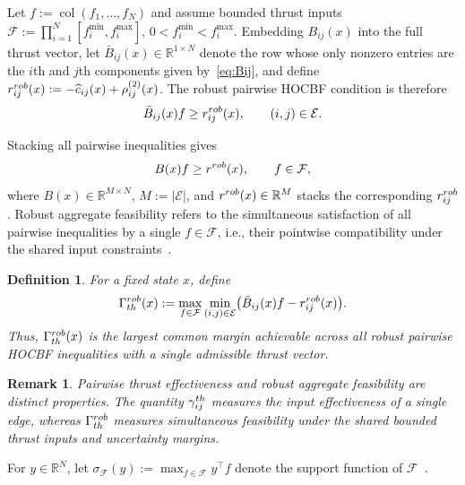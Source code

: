 \documentclass[10pt,a4paper]{amsart}
\newtheorem{definition}[theorem]{Definition}
\newtheorem{remark}[theorem]{Remark}
\begin{document}
Let $f:=\operatorname{col}(f_1,\ldots,f_N)$ and assume bounded
thrust inputs
$\displaystyle{\mathcal F:=\prod_{i=1}^N[f_i^{\min},f_i^{\max}]},\,
 0<f_i^{\min}<f_i^{\max}$.
Embedding $B_{ij}(x)$ into the full thrust vector, let
$\bar B_{ij}(x)\in\mathbb R^{1\times N}$ denote the row whose
only nonzero entries are the $i$th and $j$th components
given by~\eqref{eq:Bij}, and define
$r_{ij}^{\rm rob}(x):=
-\widehat c_{ij}(x)+\rho_{ij}^{(2)}(x)$. The robust pairwise HOCBF condition is therefore
\begin{equation}
    \bar B_{ij}(x)f\ge r_{ij}^{\rm rob}(x),
    \qquad (i,j)\in\mathcal E.
    \label{eq:pairwise_affine_constraint}
\end{equation}

Stacking all pairwise inequalities gives
\begin{equation}
    B(x)f\ge r^{\rm rob}(x),
    \qquad f\in\mathcal F,
    \label{eq:aggregate_constraints}
\end{equation}
where $B(x)\in\mathbb R^{M\times N}$,
$M:=|\mathcal E|$, and $r^{\rm rob}(x)\in\mathbb R^M$
stacks the corresponding $r_{ij}^{\rm rob}$. Robust aggregate
feasibility refers to the simultaneous satisfaction of all
pairwise inequalities by a single $f\in\mathcal F$, i.e.,
their pointwise compatibility under the shared input
constraints~\cite{tan2022compatibility}.

\begin{definition}
For a fixed state $x$, define
\begin{equation}
    \Gamma_{\rm th}^{\rm rob}(x)
    :=
    \max_{f\in\mathcal F}
    \min_{(i,j)\in\mathcal E}
    \bigl(
        \bar B_{ij}(x)f-r_{ij}^{\rm rob}(x)
    \bigr).
    \label{eq:Gamma_th_primal}
\end{equation}
Thus, $\Gamma_{\rm th}^{\rm rob}(x)$ is the largest common
margin achievable across all robust pairwise HOCBF
inequalities with a single admissible thrust vector.
\end{definition}

\begin{remark}
Pairwise thrust effectiveness and robust aggregate feasibility
are distinct properties. The quantity $\gamma_{ij}^{\rm th}$
measures the input effectiveness of a single edge, whereas
$\Gamma_{\rm th}^{\rm rob}$ measures simultaneous feasibility
under the shared bounded thrust inputs and uncertainty margins.
\end{remark}

For $y\in\mathbb R^N$, let
$\sigma_{\mathcal F}(y):=\max_{f\in\mathcal F}y^\top f$
denote the support function of $\mathcal F$~\cite{boyd2004convex}.
\end{document}
